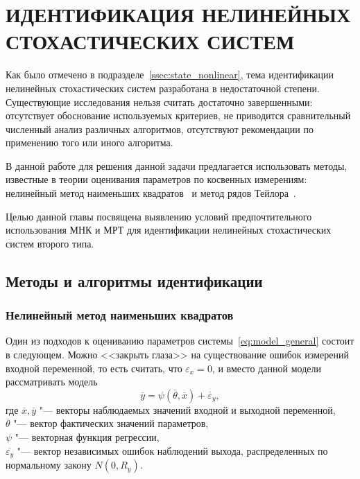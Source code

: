 \chapter[Идентификация нелинейных стохастических систем]{%
  ИДЕНТИФИКАЦИЯ НЕЛИНЕЙНЫХ \\
  СТОХАСТИЧЕСКИХ СИСТЕМ
}

Как было отмечено в подразделе~\ref{ssec:state_nonlinear},
тема идентификации нелинейных стохастических систем разработана
в недостаточной степени.
Существующие исследования нельзя считать достаточно завершенными:
отсутствует обоснование используемых критериев,
не приводится сравнительный численный анализ различных алгоритмов,
отсутствуют рекомендации по применению того или иного алгоритма.

В данной работе для решения данной задачи предлагается использовать методы,
известные в теории оценивания параметров по косвенных измерениям:
нелинейный метод наименьших квадратов~\cite{mukha_2009} и
метод рядов Тейлора~\cite{mukha_2000}.

Целью данной главы посвящена выявлению условий предпочтительного
использования МНК и МРТ для идентификации нелинейных
стохастических систем второго типа.

\vspace{2\baselineskip}
\section{Методы и алгоритмы идентификации}

\subsection{Нелинейный метод наименьших квадратов}\label{ssec:nonlinear_method_lse}

Один из подходов к оцениванию параметров системы~\eqref{eq:model_general}
состоит в следующем.
Можно <<закрыть глаза>> на существование ошибок измерений
входной переменной, то есть считать, что \( \varepsilon_x = 0 \),
и вместо данной модели рассматривать модель
\begin{equation*}
  \overline{y} = \psi(\overline{\theta}, \overline{x}) + \overline{\varepsilon}_y,
\end{equation*}
где \( \overline{x}, \overline{y} \)
"--- векторы наблюдаемых значений входной и выходной переменной, \\
\hspace*{7mm} \( \overline{\theta} \)
"--- вектор фактических значений параметров, \\
\hspace*{7mm} \( \psi \)
"--- векторная функция регрессии, \\
\hspace*{7mm} \( \overline{\varepsilon_y} \)
"--- вектор независимых ошибок наблюдений выхода,
распределенных по нормальному закону \( N(0, R_y) \).

